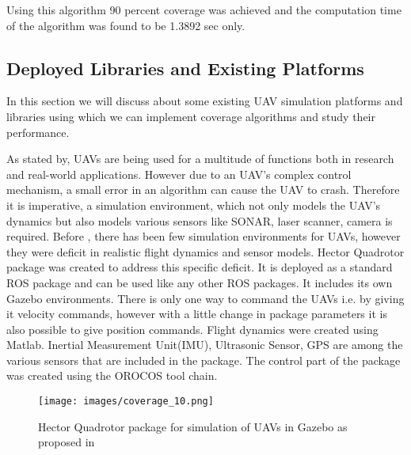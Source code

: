    

Using this algorithm 90 percent coverage was achieved and the computation time of the algorithm was found to be 1.3892 sec only.\\

\pagebreak
\subsection{Deployed Libraries and Existing Platforms}

In this section we will discuss about some existing UAV simulation platforms and libraries using which we can implement coverage algorithms and study their performance.

As stated by\cite{11}, UAVs are being used for a multitude of functions both in research and real-world applications. However due to an UAV's complex control mechanism, a small error in an algorithm can cause the UAV to crash. Therefore it is imperative, a simulation environment, which not only models the UAV's dynamics but also models various sensors like SONAR, laser scanner, camera is required. Before \cite{11}, there has been few simulation environments for UAVs, however they were deficit in realistic flight dynamics and sensor models. Hector Quadrotor package was created to address this specific deficit. It is deployed as a standard ROS package and can be used like any other ROS packages. It includes its own Gazebo environments. There is only one way to command the UAVs i.e. by giving it velocity commands, however with a little change in package parameters it is also possible to give position commands. Flight dynamics were created using Matlab. Inertial Measurement Unit(IMU), Ultrasonic Sensor, GPS are among the various sensors that are included in the package. The control part of the package was created using the OROCOS \cite{23} tool chain. 

\begin{figure}[htbp] %
 \centering
   \texttt{[image: images/coverage\_10.png]}
   \caption[Hector Quadrotor package for simulation of UAVs in Gazebo \cite{11}]
   {Hector Quadrotor package for simulation of UAVs in Gazebo as  proposed in\cite{11}}
   
\label{fig:hq}
\end{figure}

